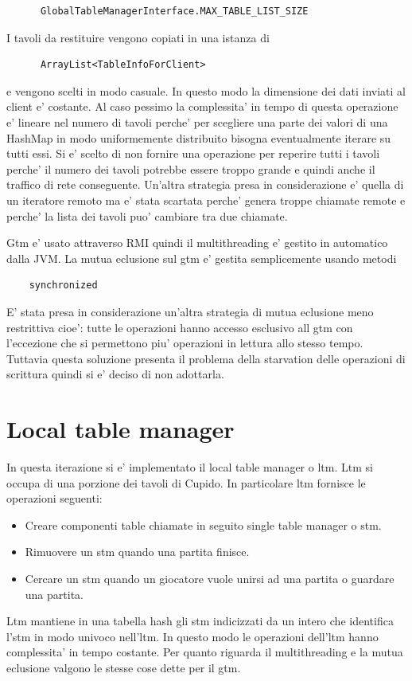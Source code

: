 \begin{description}
\begin{verbatim}
	  GlobalTableManagerInterface.MAX_TABLE_LIST_SIZE
	\end{verbatim}
	I tavoli da restituire vengono copiati in una istanza di
	\begin{verbatim}
	  ArrayList<TableInfoForClient>
	\end{verbatim}
	e vengono scelti in modo casuale. In questo modo la dimensione dei dati inviati al client e' costante. Al caso pessimo la complessita' in tempo di questa operazione e' lineare nel numero di tavoli perche' per scegliere una parte dei valori di una HashMap in modo uniformemente distribuito bisogna eventualmente iterare su tutti essi. Si e' scelto di non fornire una operazione per reperire tutti i tavoli perche' il numero dei tavoli potrebbe essere troppo grande e quindi anche il traffico di rete conseguente. Un'altra strategia presa in considerazione e' quella di un iteratore remoto ma e' stata scartata perche' genera troppe chiamate remote e perche' la lista dei tavoli puo' cambiare tra due chiamate.
    \end{description}
  Gtm e' usato attraverso RMI quindi il multithreading e' gestito in automatico dalla JVM. La mutua eclusione sul gtm e' gestita semplicemente usando metodi \begin{verbatim}
    synchronized
  \end{verbatim} 
  E' stata presa in considerazione un'altra strategia di mutua eclusione meno restrittiva cioe': tutte le operazioni hanno accesso esclusivo all gtm con l'eccezione che si permettono piu' operazioni in lettura allo stesso tempo. Tuttavia questa soluzione presenta il problema della starvation delle operazioni di scrittura quindi si e' deciso di non adottarla.


\section{Local table manager}
  In questa iterazione si e' implementato il local table manager o ltm. Ltm si occupa di una porzione dei tavoli di Cupido. In particolare ltm fornisce le operazioni seguenti:
  \begin{itemize}
    \item 
      Creare componenti table chiamate in seguito single table manager o stm.
    \item 
      Rimuovere un stm quando una partita finisce.
    \item 
      Cercare un stm quando un giocatore vuole unirsi ad una partita o guardare una partita.
  \end{itemize}
  Ltm mantiene in una tabella hash gli stm indicizzati da un intero che identifica l'stm in modo univoco nell'ltm. In questo modo le operazioni dell'ltm hanno complessita' in tempo costante.
  Per quanto riguarda il multithreading e la mutua eclusione valgono le stesse cose dette per il gtm.

